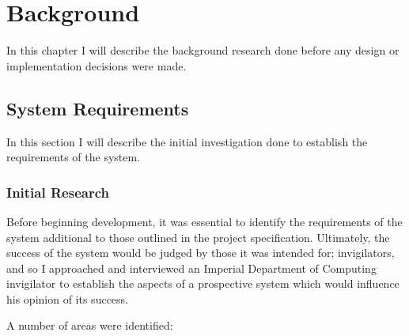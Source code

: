 
\chapter{Background}

\label{ch:background}

In this chapter I will describe the background research done before any design or implementation decisions were made.

\section{System Requirements}

In this section I will describe the initial investigation done to establish the requirements of the system.

\subsection{Initial Research}

Before beginning development, it was essential to identify the requirements of the system additional to those outlined in the project specification.  Ultimately, the success of the system would be judged by those it was intended for; invigilators, and so I approached and interviewed an Imperial Department of Computing invigilator to establish the aspects of a prospective system which would influence his opinion of its success.

A number of areas were identified:

